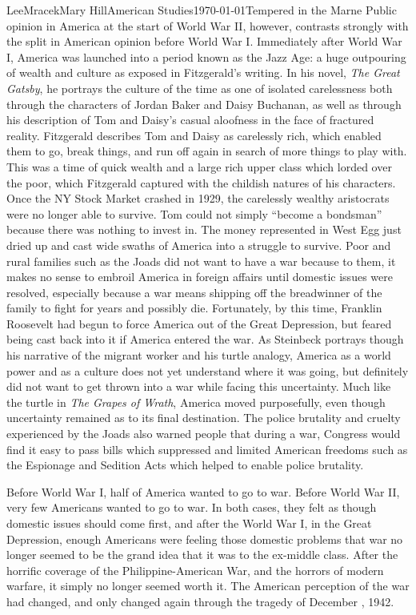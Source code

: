 \documentclass{article}
\begin{document}
\begin{mla}{Lee}{Mracek}{Mary Hill}{American Studies}{\today}{Tempered in the Marne}
    Public opinion in America at the start of World War II, however, contrasts strongly with the split in American opinion before World War I. Immediately after World War I, America was launched into a period known as the Jazz Age: a huge outpouring of wealth and culture as exposed in Fitzgerald's writing. In his novel, \textit{The Great Gatsby}, he portrays the culture of the time as one of isolated carelessness both through the characters of Jordan Baker and Daisy Buchanan, as well as through his description of Tom and Daisy's casual aloofness in the face of fractured reality. Fitzgerald describes Tom and Daisy as carelessly rich, which enabled them to go, break things, and run off again in search of more things to play with. This was a time of quick wealth and a large rich upper class which lorded over the poor, which Fitzgerald captured with the childish natures of his characters. Once the NY Stock Market crashed in 1929, the carelessly wealthy aristocrats were no longer able to survive. Tom could not simply ``become a bondsman'' because there was nothing to invest in. The money represented in West Egg just dried up and cast wide swaths of America into a struggle to survive. Poor and rural families such as the Joads did not want to have a war because to them, it makes no sense to embroil America in foreign affairs until domestic issues were resolved, especially because a war means shipping off the breadwinner of the family to fight for years and possibly die. Fortunately, by this time, Franklin Roosevelt had begun to force America out of the Great Depression, but feared being cast back into it if America entered the war. As Steinbeck portrays though his narrative of the migrant worker and his turtle analogy, America as a world power and as a culture does not yet understand where it was going, but definitely did not want to get thrown into a war while facing this uncertainty. Much like the turtle in \textit{The Grapes of Wrath}, America moved purposefully, even though uncertainty remained as to its final destination. The police brutality and cruelty experienced by the Joads also warned people that during a war, Congress would find it easy to pass bills which suppressed and limited American freedoms such as the Espionage and Sedition Acts which helped to enable police brutality.
    
    Before World War I, half of America wanted to go to war. Before World War II, very few Americans wanted to go to war. In both cases, they felt as though domestic issues should come first, and after the World War I, in the Great Depression, enough Americans were feeling those domestic problems that war no longer seemed to be the grand idea that it was to the ex-middle class. After the horrific coverage of the Philippine-American War, and the horrors of modern warfare, it simply no longer seemed worth it. The American perception of the war had changed, and only changed again through the tragedy of December , 1942.
\end{mla}
\end{document}
